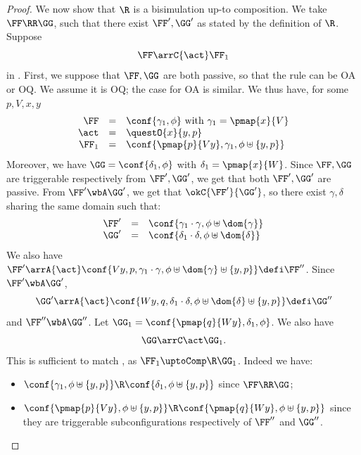 \begin{proof}
  We now show that $\R$ is a bisimulation up-to composition.
  We take $\FF \RR \GG$, such that there exist $\FF', \GG'$
  as stated by the definition of $\R$.
  Suppose 
  \begin{equation}
  \label{e:KoaH}
   \FF \arrC{\act} \FF_1 
  \end{equation} 
  in \COGS.  
  First, we suppose that $\FF,\GG$ are both passive, 
  so that the rule can be OA or OQ.  
  We assume it is OQ; the case for OA is similar. 
  We thus have, for some $p,V,x,y$ 
  \[\begin{array}{rcl}
   \FF &=&  \conf{ \gamma_1, \phi} \mbox{ with }  \gamma_1 = \pmap{x}{V} \\
   \act & = & \questO{x}{y,p} \\
   \FF_1 & = & \conf{\pmap{p}{V y}, \gamma_1,\phi \uplus \{y,p\}}
  \end{array}\]
  Moreover, we have $\GG = \conf{ \delta_1, \phi}$ 
  with $\delta_1 = \pmap{x}{W}$.
  Since $\FF,\GG$ are triggerable respectively from $\FF',\GG'$,
  we get that both $\FF',\GG'$ are passive.
  From $\FF' \wbA \GG'$, we get that $\okC{\FF'}{\GG'}$,
  so there exist $\gamma, \delta$ sharing the same domain such that:  
  \[\begin{array}{rcl}
  \FF' & = & \conf{ \gamma_1 \cdot \gamma,\phi \uplus \dom{\gamma}} \\ 
  \GG' & = & \conf{ \delta_1 \cdot \delta,\phi \uplus \dom{\delta}} 
  \end{array}\]
  We also have 
  $ \FF' \arrA{\act} \conf{V y,p, \gamma_1 \cdot \gamma, \phi\uplus \dom{\gamma} \uplus \{y,p\}} 
  \defi \FF''$. 
  Since $\FF' \wbA \GG'$, 
  \[ \GG'  \arrA{\act} \conf{W y,q, \delta_1 \cdot \delta, \phi \uplus \dom{\delta} \uplus \{y,p\}}  
  \defi \GG''\]
  and $\FF'' \wbA \GG''$.
  Let $\GG_1 =   \conf{\pmap{q}{W y}, \delta_1,\phi}$.
  We also have 
  \[ \GG \arrC  \act \GG_1. \] 
  This is sufficient to match , as 
  $\FF_1 \uptoComp \R  \GG_1$. Indeed we have:
  \begin{itemize}  
  \item $\conf{\gamma_1,\phi\uplus \{y,p\}} \R  \conf{\delta_1,\phi\uplus \{y,p\}}$
  since $\FF \RR \GG$;
  \item  $\conf{\pmap{p}{V y}, \phi\uplus \{y,p\}} \R  \conf{\pmap{q}{W y}, \phi\uplus \{y,p\}}$
  since they are triggerable subconfigurations respectively of $\FF''$ and $\GG''$.
  \end{itemize}


\end{proof}
